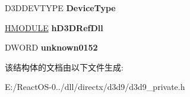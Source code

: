 \begin{DoxyCompactItemize}
\mbox{\label{struct___d3_d9___d_e_v_i_c_e_d_a_t_a_afb03d8beb568fb1a93190def26c2323f}} 
D3\+D\+D\+E\+V\+T\+Y\+PE {\bfseries Device\+Type}
\item 
\mbox{\label{struct___d3_d9___d_e_v_i_c_e_d_a_t_a_a109c32952819923afd5e4bc74f81b425}} 
\hyperlink{interfacevoid}{H\+M\+O\+D\+U\+LE} {\bfseries h\+D3\+D\+Ref\+Dll}
\item 
\mbox{\label{struct___d3_d9___d_e_v_i_c_e_d_a_t_a_afe29acbe355e016029e61fc8de95dec8}} 
D\+W\+O\+RD {\bfseries unknown0152}
\end{DoxyCompactItemize}


该结构体的文档由以下文件生成\+:\begin{DoxyCompactItemize}
\item 
E\+:/\+React\+O\+S-\/0../dll/directx/d3d9/d3d9\+\_\+private.\+h\end{DoxyCompactItemize}
